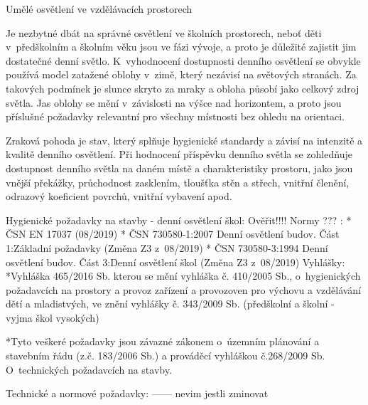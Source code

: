 \sec Umělé osvětlení ve vzdělávacích prostorech

Je nezbytné dbát na správné osvětlení ve školních prostorech, neboť děti v~předškolním a školním věku jsou ve fázi vývoje,
a proto je důležité zajistit jim dostatečné denní světlo.
K~vyhodnocení dostupnosti denního osvětlení se obvykle používá model zatažené oblohy v~zimě, který nezávisí na světových stranách.
Za takových podmínek je slunce skryto za mraky a obloha působí jako celkový zdroj světla.
Jas oblohy se mění v~závislosti na výšce nad horizontem, a proto jsou příslušné požadavky relevantní pro všechny místnosti bez ohledu na orientaci.

Zraková pohoda je stav, který splňuje hygienické standardy a závisí na intenzitě a kvalitě denního osvětlení.
Při hodnocení příspěvku denního světla se zohledňuje dostupnost denního světla na daném místě a charakteristiky
prostoru, jako jsou vnější překážky, průchodnost zasklením, tloušťka stěn a střech, vnitřní členění, odrazový
koeficient povrchů, vnitřní vybavení apod.

\secc Hygienické požadavky na stavby - denní osvětlení škol:
Ověřit!!!! Normy ??? :
\begitems
* ČSN EN 17037 (08/2019)
* ČSN 730580-1:2007 Denní osvětlení budov. Část 1:Základní požadavky (Změna Z3 z~08/2019)
* ČSN 730580-3:1994 Denní osvětlení budov. Část 3:Denní osvětlení škol (Změna Z3 z~08/2019)
\medskip
{\sbf Vyhlášky:}
\medskip
*Vyhláška 465/2016 Sb. kterou se mění vyhláška č. 410/2005 Sb., o~hygienických požadavcích na prostory a
provoz zařízení a provozoven pro výchovu a vzdělávání dětí a mladistvých, ve znění vyhlášky č. 343/2009 Sb.
(předškolní a školní - vyjma škol vysokých)

*Tyto veškeré požadavky jsou závazné zákonem o~územním plánování a stavebním řádu (z.č. 183/2006 Sb.) a
prováděcí vyhláškou č.268/2009 Sb. O~technických požadavcích na stavby.
\enditems

\secc Technické a normové požadavky:   ------ nevim jestli zminovat

